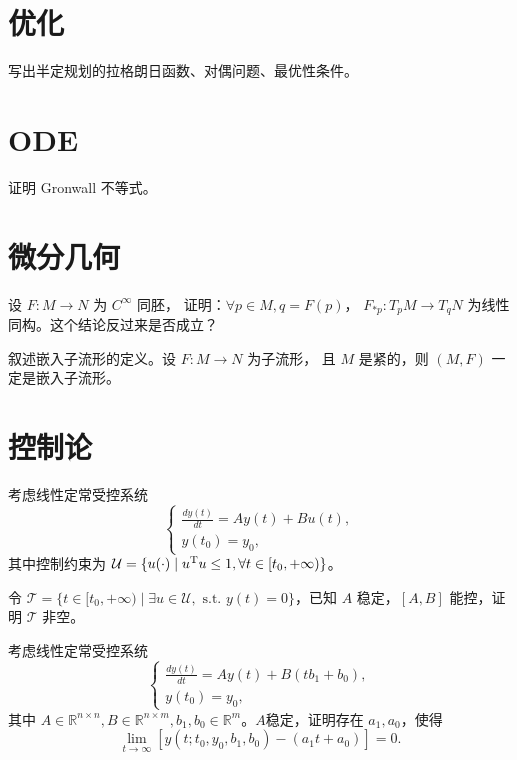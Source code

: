 \section{优化}

\begin{problem}
写出半定规划的拉格朗日函数、对偶问题、最优性条件。
\end{problem}

\section{ODE}

\begin{problem}
证明 Gronwall 不等式。
\end{problem}

\section{微分几何}

\begin{problem}
    设 \( F : M \to N \) 为 \( C^\infty \) 同胚，
    证明：\(\forall p \in M, q = F(p)\)，
    \( F_{*p} : T_pM \to T_qN \) 为线性同构。这个结论反过来是否成立？
\end{problem}
\begin{problem} 
    叙述嵌入子流形的定义。设 \( F : M \to N \) 为子流形，
    且 \( M \) 是紧的，则 \((M, F)\) 一定是嵌入子流形。
\end{problem}

\section{控制论}

\begin{problem}
    考虑线性定常受控系统
    \[
    \begin{cases} 
    \frac{dy(t)}{dt} = Ay(t) + Bu(t), \\ 
    y(t_0) = y_0, 
    \end{cases}
    \]
    其中控制约束为 \(\mathcal{U} = \{u(\cdot) \mid u^{\rm T}u \leq 1, \forall t \in [t_0, +\infty)\}\)。
    
    令 \(\mathcal{T} = \{t \in [t_0, +\infty) \mid \exists u \in \mathcal{U}, \text{ s.t. } y(t) = 0\}\)，已知 \(A\) 稳定，\([A, B]\) 能控，证明 \(\mathcal{T}\) 非空。
 \end{problem}
 \begin{problem}
    考虑线性定常受控系统
    \[
    \begin{cases} 
    \frac{dy(t)}{dt} = Ay(t) + B(tb_1 + b_0), \\ 
    y(t_0) = y_0,
    \end{cases}
    \]
    其中 \( A \in \mathbb{R}^{n \times n}, B \in \mathbb{R}^{n \times m}, b_1, b_0 \in \mathbb{R}^m \)。$A$稳定，证明存在 \( a_1, a_0 \)，使得
    \[
    \lim_{t \to \infty} [y(t; t_0, y_0, b_1, b_0) - (a_1 t + a_0)] = 0.
    \]
\end{problem}